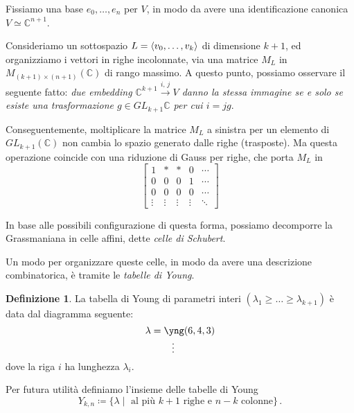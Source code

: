 \documentclass[a4paper, 11pt]{article}
\theoremstyle{definition}
\newtheorem{Def}{Definizione}[section]
\theoremstyle{plain}
\DeclarePairedDelimiter{\ang}{\langle}{\rangle}
\newcommand{\C}{\mathbb{C}}
\newcommand{\deff}{\coloneqq}
\begin{document}
Fissiamo una base $e_0, \dots, e_n$ per $V$, in modo da avere una identificazione canonica $V \simeq \C^{n+1}$.

Consideriamo un sottospazio $L = \ang{v_0, \dots, v_k}$ di dimensione $k+1$, ed organizziamo i vettori in righe incolonnate, via una matrice $M_L$ in $M_{(k+1)\times (n+1)}(\C)$ di rango massimo. A questo punto, possiamo osservare il seguente fatto: \emph{due embedding $\C^{k+1} \xrightarrow{i,\,j} V$ danno la stessa immagine se e solo se esiste una trasformazione $g \in GL_{k+1}\C$ per cui $i = jg$}.

Conseguentemente, moltiplicare la matrice $M_L$ a sinistra per un elemento di $GL_{k+1}(\C)$ non cambia lo spazio generato dalle righe (trasposte). Ma questa operazione coincide con una riduzione di Gauss per righe, che porta $M_L$ in 
\[
\begin{bmatrix}
	1 & * & * & 0 & \cdots \\
	0 & 0 & 0 & 1 & \cdots \\
	0 & 0 & 0 & 0 & \cdots\\
	\vdots & \vdots & \vdots & \vdots & \ddots 
\end{bmatrix}
\]

In base alle possibili configurazione di questa forma, possiamo decomporre la Grassmaniana in celle affini, dette \emph{celle di Schubert}.

Un modo per organizzare queste celle, in modo da avere una descrizione combinatorica, è tramite le \emph{tabelle di Young}.
\begin{Def}
	La tabella di Young di parametri interi $(\lambda_1 \ge \dots \ge \lambda_{k+1})$ è data dal diagramma seguente:
	\[
		\lambda = \underset{\vdots\ \ \ \ \ \ \ \ \ \ }{\yng(6,4,3)}
	\]
	dove la riga $i$ ha lunghezza $\lambda_i$.
\end{Def}
Per futura utilità definiamo l'insieme delle tabelle di Young
\[
	Y_{k,n} \deff \{\lambda \mid \text{ al più $k+1$ righe e $n - k$ colonne}\}\,.
\]
\end{document}
